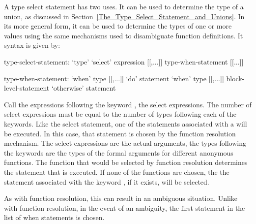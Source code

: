 A type select statement has two uses.  It can be used to determine the
type of a union, as discussed in
Section~\ref{The_Type_Select_Statement_and_Unions}.  In its more
general form, it can be used to determine the types of one or more
values using the same mechanisms used to disambiguate function
definitions.  It syntax is given by:
\begin{syntax}
type-select-statement:
  `type' `select' expression [[,...]] { type-when-statement [[...]] }

type-when-statement:
  `when' type [[,...]] `do' statement
  `when' type [[,...]] block-level-statement
  `otherwise' statement
\end{syntax}

Call the expressions following the keyword , the select
expressions.  The number of select expressions must be equal to the
number of types following each of the  keywords.  Like the
select statement, one of the statements associated with a 
will be executed.  In this case, that statement is chosen by the
function resolution mechanism.  The select expressions are the actual
arguments, the types following the  keywords are the types
of the formal arguments for different anonymous functions.  The
function that would be selected by function resolution determines the
statement that is executed.  If none of the functions are chosen, the
the statement associated with the keyword , if it
exists, will be selected.

As with function resolution, this can result in an ambiguous
situation.  Unlike with function resolution, in the event of an
ambiguity, the first statement in the list of when statements is
chosen.
